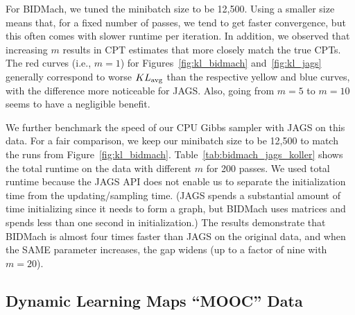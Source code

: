 \documentclass{article} %
\begin{document}
For BIDMach, we tuned the minibatch size to be 12,500. Using a smaller size means that, for a fixed
number of passes, we tend to get faster convergence, but this often comes with slower runtime per
iteration. In addition, we observed that increasing $m$ results in CPT estimates that more closely
match the true CPTs. The red curves (i.e., $m=1$) for Figures~\ref{fig:kl_bidmach}
and~\ref{fig:kl_jags} generally correspond to worse $KL_{\rm avg}$ than the respective yellow and
blue curves, with the difference more noticeable for JAGS. Also, going from $m=5$ to $m=10$ seems to
have a negligible benefit.

We further benchmark the speed of our CPU Gibbs sampler with JAGS on this data. For a fair
comparison, we keep our minibatch size to be 12,500 to match the runs from
Figure~\ref{fig:kl_bidmach}.  Table~\ref{tab:bidmach_jags_koller} shows the total runtime on the
data with different $m$ for 200 passes. We used total runtime because the JAGS API does not enable
us to separate the initialization time from the updating/sampling time. (JAGS spends a substantial
amount of time initializing since it needs to form a graph, but BIDMach uses matrices and
spends less than one second in initialization.) The results demonstrate that BIDMach is almost four
times faster than JAGS on the original data, and when the SAME parameter increases, the gap widens
(up to a factor of nine with $m=20$).




\subsection{Dynamic Learning Maps ``MOOC'' Data}\label{ssec:mooc_data}
\end{document}
